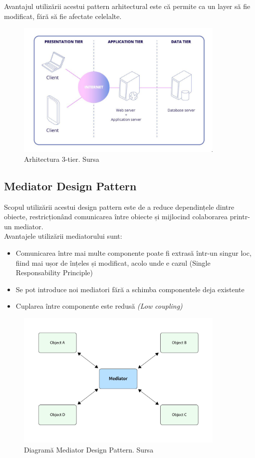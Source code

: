 \vspace{1em}
Avantajul utilizării acestui pattern arhitectural este că permite ca un layer să fie modificat, fără să fie afectate celelalte.
\begin{figure}[h]
	\centering
	\includegraphics[width=100mm, scale=1]{figs/threetier.png}
    \caption{Arhitectura 3-tier. Sursa~\cite{ThreeTier}}
	\label{fig:threetier}
\end{figure}
\subsection{Mediator Design Pattern}
Scopul utilizării acestui design pattern este de a reduce dependințele dintre obiecte, restricționând comunicarea între obiecte și mijlocind colaborarea printr-un mediator. \\

\noindent Avantajele utilizării mediatorului sunt:
\begin{itemize}
	\setlength\itemsep{0.5em}
    \item Comunicarea între mai multe componente poate fi extrasă într-un singur loc, fiind mai ușor de înțeles și modificat, acolo unde e cazul (Single Responsability Principle)
    \item Se pot introduce noi mediatori fără a schimba componentele deja existente
    \item Cuplarea între componente este redusă {\it (Low coupling)}
\end{itemize}
\begin{figure}[H]
	\centering
	\includegraphics[width=100mm, scale=1]{figs/mediator.png}
    \caption{Diagramă Mediator Design Pattern. Sursa~\cite{Mediator}}
	\label{fig:mediator}
\end{figure}
